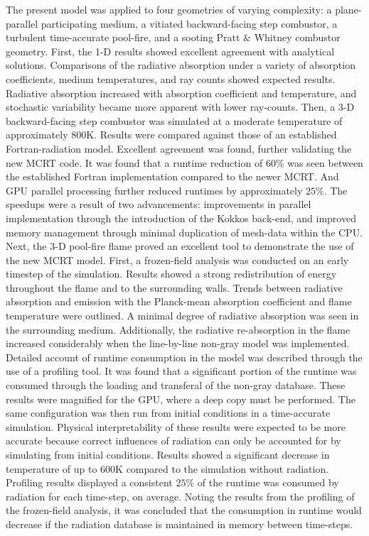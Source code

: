 The present model was applied to four geometries of varying complexity: a plane-parallel participating medium, a vitiated backward-facing step combustor, a turbulent time-accurate pool-fire, and a sooting Pratt \& Whitney combustor geometry.
First, the 1-D results showed excellent agreement with analytical solutions. Comparisons of the radiative absorption under a variety of absorption coefficients, medium temperatures, and ray counts showed expected results. Radiative absorption increased with absorption coefficient and temperature, and stochastic variability became more apparent with lower ray-counts.
Then, a 3-D backward-facing step combustor was simulated at a moderate temperature of approximately $800$K. Results were compared against those of an established Fortran-radiation model. Excellent agreement was found, further validating the new MCRT code. It was found that a runtime reduction of $60$\% was seen between the established Fortran implementation compared to the newer MCRT. And GPU parallel processing further reduced runtimes by approximately $25$\%. The speedups were a result of two advancements: improvements in parallel implementation through the introduction of the Kokkos back-end, and improved memory management through minimal duplication of mesh-data within the CPU.
Next, the 3-D pool-fire flame proved an excellent tool to demonstrate the use of the new MCRT model. First, a frozen-field analysis was conducted on an early timestep of the simulation. Results showed a strong redistribution of energy throughout the flame and to the surrounding walls. Trends between radiative absorption and emission with the Planck-mean absorption coefficient and flame temperature were outlined. A minimal degree of radiative absorption was seen in the surrounding medium. Additionally, the radiative re-absorption in the flame increased considerably when the line-by-line non-gray model was implemented. Detailed account of runtime consumption in the model was described through the use of a profiling tool. It was found that a significant portion of the runtime was consumed through the loading and transferal of the non-gray database. These results were magnified for the GPU, where a deep copy must be performed.
The same configuration was then run from initial conditions in a time-accurate simulation. Physical interpretability of these results were expected to be more accurate because correct influences of radiation can only be accounted for by simulating from initial conditions. Results showed a significant decrease in temperature of up to $600$K compared to the simulation without radiation. Profiling results displayed a consistent $25$\% of the runtime was consumed by radiation for each time-step, on average. Noting the results from the profiling of the frozen-field analysis, it was concluded that the consumption in runtime would decrease if the radiation database is maintained in memory between time-steps.
